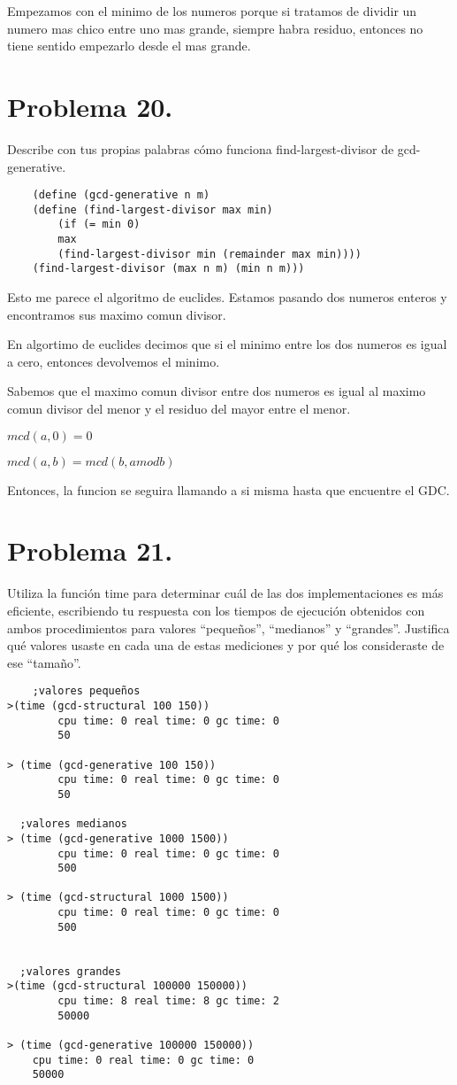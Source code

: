\documentclass{article}
\begin{document}
Empezamos con el minimo de los numeros porque si tratamos de dividir un numero mas chico entre uno mas grande, siempre habra residuo, entonces no tiene sentido empezarlo desde el mas grande.


\section*{Problema 20.}
Describe con tus propias palabras cómo funciona find-largest-divisor de gcd-
generative.

\begin{lstlisting}
    (define (gcd-generative n m)
	(define (find-largest-divisor max min)
		(if (= min 0)
		max
		(find-largest-divisor min (remainder max min))))
	(find-largest-divisor (max n m) (min n m)))
\end{lstlisting}

Esto me parece el algoritmo de euclides. Estamos pasando dos numeros enteros y encontramos sus maximo comun divisor.

En algortimo de euclides decimos que si el minimo entre los dos numeros es igual a cero, entonces devolvemos el minimo.

Sabemos que el maximo comun divisor entre dos numeros es igual al maximo comun divisor del menor y el residuo del mayor entre el menor.

$mcd(a,0) = 0$

$mcd(a,b)=mcd(b, a mod b)$

Entonces, la funcion se seguira llamando a si misma hasta que encuentre el GDC.

\section*{Problema 21.}
Utiliza la función time para determinar cuál de las dos implementaciones es más
eficiente, escribiendo tu respuesta con los tiempos de ejecución obtenidos con ambos procedimientos
para valores “pequeños”, “medianos” y “grandes”. Justifica qué valores usaste en cada una de estas
mediciones y por qué los consideraste de ese “tamaño”.

\begin{lstlisting}
    ;valores pequeños
>(time (gcd-structural 100 150))
		cpu time: 0 real time: 0 gc time: 0
		50

> (time (gcd-generative 100 150))
		cpu time: 0 real time: 0 gc time: 0
		50

  ;valores medianos
> (time (gcd-generative 1000 1500))
		cpu time: 0 real time: 0 gc time: 0
		500

> (time (gcd-structural 1000 1500))
		cpu time: 0 real time: 0 gc time: 0
		500


  ;valores grandes
>(time (gcd-structural 100000 150000))
		cpu time: 8 real time: 8 gc time: 2
		50000

> (time (gcd-generative 100000 150000))
    cpu time: 0 real time: 0 gc time: 0
    50000
\end{lstlisting}
\end{document}
